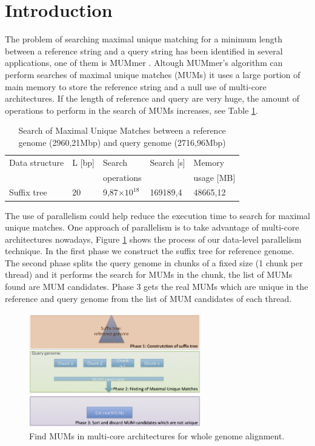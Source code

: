 \documentclass[3p,times]{elsarticle}
\providecommand{\e}[1]{\ensuremath{\times 10^{#1}}}
\begin{document}

\section{Introduction} 
\label{}
The problem of searching maximal unique matching for a minimum length between a reference
string and a query string has been
identified in several applications, one of them is MUMmer \cite{Delcher2003}. Altough
MUMmer's algorithm can perform searches of maximal unique matches (MUMs)
it uses a large portion of main memory to store the reference string and a null use of multi-core architectures.
If the length of reference and query are very huge, the amount of operations to perform
in the search of MUMs increases, see Table \ref{tbl:operations}.
\begin{table}[ h!] 
  \begin{small}
    \begin{center}
      \begin{tabular}{lllll}
        Data structure & L [bp] & Search  & Search [s] & Memory\\
        & & operations & & usage [MB]\\
        \hline
        Suffix tree & 20 & 9,87\e{18}  & 169189,4 & 48665,12\\
        \hline
      \end{tabular}
    \end{center}
  \end{small}
  \caption{Search of Maximal Unique Matches between a reference genome (2960,21Mbp) and query genome (2716,96Mbp)}
  \label{tbl:operations}
\end{table}
The use of parallelism could help reduce the execution time to search for maximal unique matches. One approach of parallelism is to take advantage of multi-core architectures nowadays, Figure \ref{algorithm} shows the process of our data-level parallelism technique. In the first phase we construct the suffix tree for reference genome. The second phase splits the query genome in chunks of a fixed size (1 chunk per thread) and it performs the search for MUMs in the chunk, the list of MUMs found are MUM candidates. Phase 3 gets the real MUMs which are unique in the reference and query genome from the list of MUM candidates of each thread.
\begin{figure}[htb]   
\begin{center} 
  \includegraphics[width=7.5cm,height=5cm]{Phases.png}
\end{center} 
\caption{Find MUMs in multi-core architectures for whole genome alignment.} 
\label{algorithm} 
\end{figure} 
\end{document}
